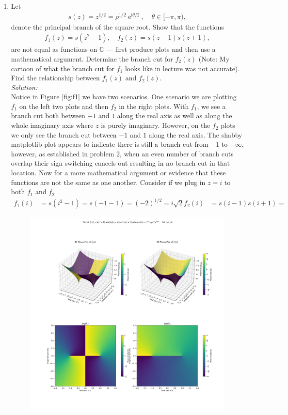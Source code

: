 \documentclass[10pt]{amsart}
\newcommand{\I}{\mathrm{i}}
\DeclareMathOperator{\E}{e}
\theoremstyle{nonumberplain}
\begin{document}
\begin{enumerate}[label={\bf {\arabic*}:}]
\item Let
  \begin{align*}
    s(z) = z^{1/2} = \rho^{1/2} \E^{\I \theta/2}, \quad \theta \in [-\pi,\pi),
  \end{align*}
  denote the principal branch of the square root.  Show that the
  functions
  \begin{align*}
    f_1(z) = s(z^2 -1), \quad f_2(z) = s(z-1) s(z+1),
  \end{align*}
  are not equal as functions on $\mathbb C$ --- first produce plots and then use a mathematical argument.  Determine the branch cut for $f_2(z)$ (Note: My
  cartoon of what the branch cut for $f_1$ looks like in lecture was
  not accurate).  Find the relationship between $f_1(z)$ and $f_2(z)$.\\
\textit{Solution:} \\
Notice in Figure \ref{fig:f1} we have two scenarios.
One scenario we are plotting $f_1$ on the left two plots and then $f_2$ in the right plots.
With $f_1$, we see a branch cut both between $-1$ and $1$ along the real axis as well as along the whole imaginary axis where $z$ is purely imaginary.
However, on the $f_2$ plots we only see the branch cut between $-1$ and $1$ along the real axis.
The shabby matplotlib plot appears to indicate there is still a branch cut from $-1$ to $-\infty$, however, as established in problem 2, when an even number of branch cuts overlap their sign switching cancels out resulting in no branch cut in that location.
Now for a more mathematical argument or evidence that these functions are not the same as one another.
Consider if we plug in $z = i$ to both $f_1$ and $f_2$
\begin{align*}
f_1(i) &= s(i^2 - 1) = s(-1 - 1) = (-2)^{1/2} = i\sqrt{2}
f_2(i) &= s(i - 1)s(i + 1) = 
\end{align*}
\begin{figure}[h]
	\centering
	\includegraphics[width=1\textwidth]{problem_4_vis.png}

\end{figure}
\end{enumerate}
\end{document}
